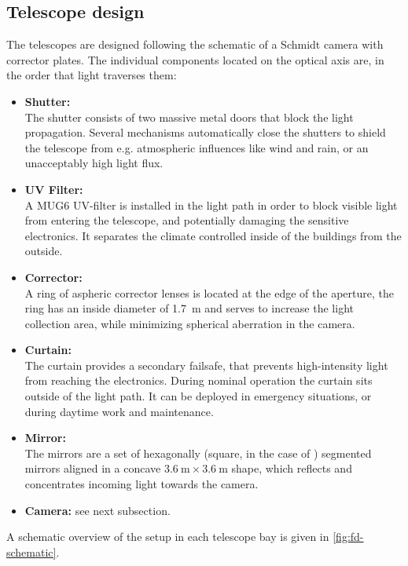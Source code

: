 \subsection{Telescope design}
\label{ssec:fd-design}

The \FD telescopes are designed following the schematic of a Schmidt camera with 
corrector plates. The individual components located on the optical axis are, in 
the order that light traverses them:

\begin{itemize}
  \item \textbf{Shutter:} \\
  The shutter consists of two massive metal doors that block the light 
  propagation. Several mechanisms automatically close the shutters to shield the 
  telescope from e.g. atmospheric influences like wind and rain, or an 
  unacceptably high light flux.
  \item \textbf{UV Filter:} \\
  A MUG6 UV-filter is installed in the light path in order to block visible 
  light from entering the telescope, and potentially damaging the sensitive 
  electronics. It separates the climate controlled inside of the \FD buildings 
  from the outside.
  \item \textbf{Corrector:} \\
  A ring of aspheric corrector lenses is located at the edge of the aperture,
  the ring has an inside diameter of \SI{1.7}{\meter} and serves to increase 
  the light collection area, while minimizing spherical aberration in the 
  camera.
  \item \textbf{Curtain:} \\
  The curtain provides a secondary failsafe, that prevents high-intensity light 
  from reaching the electronics. During nominal operation the curtain sits outside 
  of the light path. It can be deployed in emergency situations, or during daytime
  work and maintenance.
  \item \textbf{Mirror:} \\
  The mirrors are a set of hexagonally (square, in the case of \LL) segmented 
  mirrors aligned in a concave $\SI{3.6}{\meter}\times\SI{3.6}{\meter}$ shape, 
  which reflects and concentrates incoming light towards the camera.
  \item \textbf{Camera:} see next subsection.
\end{itemize}

A schematic overview of the setup in each telescope bay is given in
\cref{fig:fd-schematic}.

